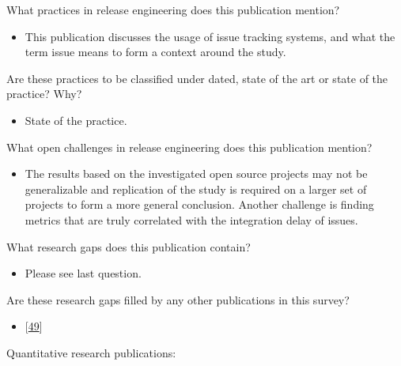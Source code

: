 \documentclass[]{book}
\providecommand{\tightlist}{%
  \setlength{\itemsep}{0pt}\setlength{\parskip}{0pt}}
\begin{document}
What practices in release engineering does this publication mention?

\begin{itemize}
\tightlist
\item
  This publication discusses the usage of issue tracking systems, and
  what the term issue means to form a context around the study.
\end{itemize}

Are these practices to be classified under dated, state of the art or
state of the practice? Why?

\begin{itemize}
\tightlist
\item
  State of the practice.
\end{itemize}

What open challenges in release engineering does this publication
mention?

\begin{itemize}
\tightlist
\item
  The results based on the investigated open source projects may not be
  generalizable and replication of the study is required on a larger set
  of projects to form a more general conclusion. Another challenge is
  finding metrics that are truly correlated with the integration delay
  of issues.
\end{itemize}

What research gaps does this publication contain?

\begin{itemize}
\tightlist
\item
  Please see last question.
\end{itemize}

Are these research gaps filled by any other publications in this survey?

\begin{itemize}
\tightlist
\item
  {[}\protect\hyperlink{ref-da2016a}{49}{]}
\end{itemize}

Quantitative research publications:
\end{document}
